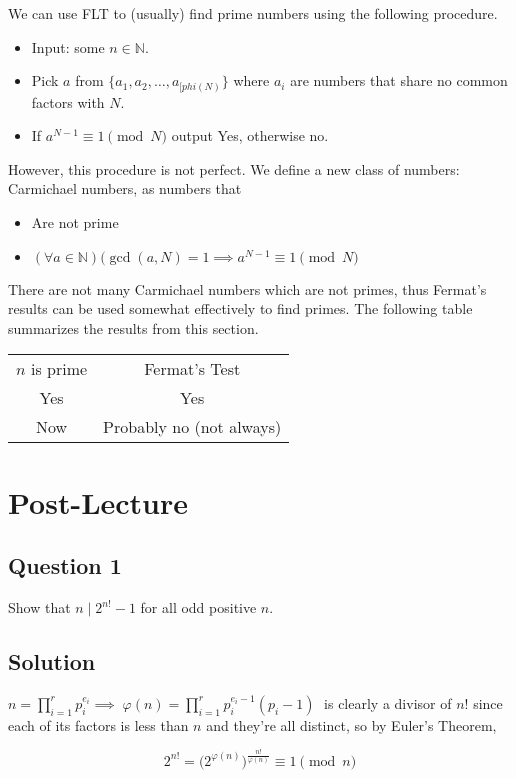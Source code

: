 \documentclass{article}
\begin{document}
    We can use FLT to (usually) find prime numbers using the following procedure.
    \begin{itemize}
        \item Input: some $n \in \mathbb{N}$.
        \item Pick $a$ from $\{a_{1}, a_{2}, \dots, a_{[phi(N)}\}$ where $a_{i}$ are numbers that share no common factors with $N$.
        \item If $a^{N - 1} \equiv 1 \pmod{N}$ output Yes, otherwise no.
    \end{itemize}
    However, this procedure is not perfect. We define a new class of numbers: Carmichael numbers, as numbers that
    \begin{itemize}
        \item Are not prime
        \item $(\forall a \in \mathbb{N})(\gcd(a, N) = 1 \implies a^{N - 1} \equiv 1 \pmod{N}$
    \end{itemize}
    There are not many Carmichael numbers which are not primes, thus Fermat's results can be used somewhat effectively to find primes.
    The following table summarizes the results from this section.
    \begin{tabular}{c|c}
        $n$ is prime & Fermat's Test \\
        Yes & Yes \\
        Now & Probably no (not always)
    \end{tabular}


\section*{Post-Lecture}

\subsection*{Question 1}
    Show that $n \mid 2^{n!} - 1$ for all odd positive $n$.

\subsection*{Solution}
    $n=\prod\limits_{i=1}^rp_i^{e_i} \implies \;\varphi(n)=\prod_{i=1}^rp_i^{e_i-1}(p_i - 1)\; $ is clearly a divisor of $n!$ since each of its factors is less than $n$ and they're all distinct, so by Euler's Theorem,
    
    $$2^{n!}= \bigl(2^{\varphi(n)} \bigr)^{\tfrac{n!}{\varphi(n)}}\equiv 1\pmod{n}$$
\end{document}
